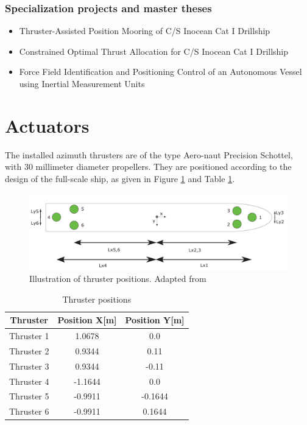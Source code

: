 \subsubsection{Specialization projects and master theses}
\begin{itemize}
	\item Thruster-Assisted Position Mooring of C/S Inocean Cat I Drillship \citep{bjorno2016thruster}
	\item Constrained Optimal Thrust Allocation for C/S Inocean Cat I Drillship \citep{frederich2016constrained}
	\item Force Field Identification and Positioning Control of an Autonomous Vessel using Inertial Measurement Units \citep{udjus2017}
\end{itemize}

\section{Actuators}
The installed azimuth thrusters are of the type Aero-naut Precision Schottel, with 30 millimeter diameter propellers. They are positioned according to the design of the full-scale ship, as given in Figure \ref{fig:thruster_positions} and Table \ref{tab:thruster_positions}. 
\begin{figure}[htb!]
	\centering
	\includegraphics[width=\linewidth]{fig/thruster_position.png}
	\caption{Illustration of thruster positions. Adapted from \cite{frederich2016constrained}}
	\label{fig:thruster_positions}
\end{figure}
\begin{table}[htb!]
	\centering
	\caption{Thruster positions}
	\label{tab:thruster_positions}
	\begin{tabular}{ccc}
		\hline
		\textbf{Thruster} & \textbf{Position X}[m] & \textbf{Position Y}[m]\\ \hline
		Thruster 1 & 1.0678 & 0.0\\
		Thruster 2 & 0.9344 & 0.11\\
		Thruster 3 & 0.9344 & -0.11\\
		Thruster 4 & -1.1644 & 0.0\\
		Thruster 5 & -0.9911 & -0.1644\\
		Thruster 6 & -0.9911 & 0.1644\\ \hline
	\end{tabular}
\end{table}

